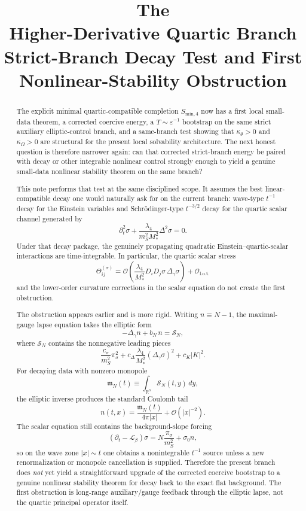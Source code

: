 \documentclass[11pt]{article}
\title{\textbf{The \TheoryName{}}\\[0.4em]
\large Higher-Derivative Quartic Branch Strict-Branch Decay Test and First Nonlinear-Stability Obstruction}
\author{}
\date{}
\newcommand{\Ell}{\mathcal{L}}
\begin{document}
\maketitle

\begin{abstract}
The explicit minimal quartic-compatible completion \(S_{\mathrm{min},4}\) now has a first local small-data theorem, a corrected coercive energy, a \(T\sim \varepsilon^{-1}\) bootstrap on the same strict auxiliary elliptic-control branch, and a same-branch test showing that \(\kappa_\theta>0\) and \(\kappa_\Omega>0\) are structural for the present local solvability architecture. The next honest question is therefore narrower again: can that corrected strict-branch energy be paired with decay or other integrable nonlinear control strongly enough to yield a genuine small-data nonlinear stability theorem on the same branch?

This note performs that test at the same disciplined scope. It assumes the best linear-compatible decay one would naturally ask for on the current branch: wave-type \(t^{-1}\) decay for the Einstein variables and Schr\"odinger-type \(t^{-3/2}\) decay for the quartic scalar channel generated by
\[
\partial_t^2\sigma + \frac{\lambda_4}{m_S^2M_*^2}\Delta^2\sigma = 0.
\]
Under that decay package, the genuinely propagating quadratic Einstein--quartic-scalar interactions are time-integrable. In particular, the quartic scalar stress
\[
\Theta_{ij}^{(\sigma)}=
\mathcal O\!\left(\frac{\lambda_4}{M_*^2}D_iD_j\sigma\,\Delta_\gamma\sigma\right)
+ \mathcal O_{\mathrm{l.o.t.}}
\]
and the lower-order curvature corrections in the scalar equation do not create the first obstruction.

The obstruction appears earlier and is more rigid. Writing \(n\equiv N-1\), the maximal-gauge lapse equation takes the elliptic form
\[
-\Delta_\gamma n + b_N\,n = \mathcal S_N,
\]
where \(\mathcal S_N\) contains the nonnegative leading pieces
\[
\frac{c_\pi}{m_S^2}\pi_\sigma^2
+ c_\Delta\frac{\lambda_4}{M_*^2}(\Delta_\gamma\sigma)^2
+ c_K |K|^2.
\]
For decaying data with nonzero monopole
\[
\mathfrak m_N(t)\equiv \int_{\mathbb R^3}\mathcal S_N(t,y)\,dy,
\]
the elliptic inverse produces the standard Coulomb tail
\[
n(t,x)=\frac{\mathfrak m_N(t)}{4\pi|x|}+\mathcal O(|x|^{-2}).
\]
The scalar equation still contains the background-slope forcing
\[
(\partial_t-\Ell_\beta)\sigma = N\frac{\pi_\sigma}{m_S^2} + \sigma_0 n,
\]
so on the wave zone \(|x|\sim t\) one obtains a nonintegrable \(t^{-1}\) source unless a new renormalization or monopole cancellation is supplied. Therefore the present branch does \emph{not} yet yield a straightforward upgrade of the corrected coercive bootstrap to a genuine nonlinear stability theorem for decay back to the exact flat background. The first obstruction is long-range auxiliary/gauge feedback through the elliptic lapse, not the quartic principal operator itself.
\end{abstract}
\end{document}
